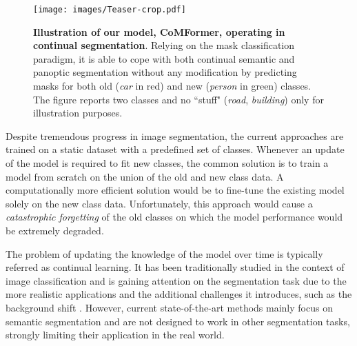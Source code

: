 \documentclass[10pt,twocolumn,letterpaper]{article}
\begin{document}
\begin{figure}
    \texttt{[image: images/Teaser-crop.pdf]}
    \caption{\textbf{Illustration of our model, CoMFormer, operating in continual segmentation}. Relying on the mask classification paradigm, it is able to cope with both continual semantic and panoptic segmentation without any modification by predicting masks for both old (\eg \textit{car} in red) and new (\eg \textit{person} in green) classes. The figure reports two classes and no “stuff" (\eg \textit{road}, \textit{building}) only for illustration purposes.}\vspace{-1em}
    \label{fig:intro_continual_panoptic}
\end{figure}

Despite tremendous progress in image segmentation, the current approaches are trained on a static dataset with a predefined set of classes. Whenever an update of the model is required to fit new classes, the common solution is to train a model from scratch on the union of the old and new class data. A computationally more efficient solution would be to fine-tune the existing model solely on the new class data. Unfortunately, this approach would cause a \textit{catastrophic forgetting} \cite{french1999catastrophicforgetting} of the old classes on which the model performance would be extremely degraded.

The problem of updating the knowledge of the model over time is typically referred as continual learning. It has been traditionally studied in the context of image classification \cite{li2018lwf, kirkpatrick2017ewc, rebuffi2017icarl, rusu2016progressive, douillard2020podnet, douillard2021dytox} and is gaining attention on the segmentation task \cite{michieli2019ilt, cermelli2020modelingthebackground, douillard2020plop, zhang2022rcil, cermelli2022modeling} due to the more realistic applications and the additional challenges it introduces, such as the background shift \cite{cermelli2020modelingthebackground}.
However, current state-of-the-art methods mainly focus on semantic segmentation and are not designed to work in other segmentation tasks, strongly limiting their application in the real world. 
\end{document}

